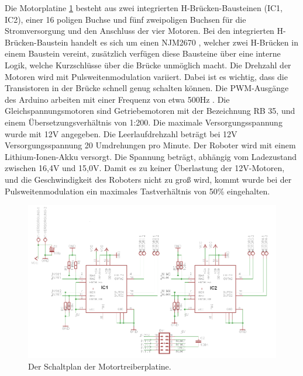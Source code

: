 \documentclass[a4paper,bibtotoc,oneside]{scrbook}
\begin{document}
Die Motorplatine \ref{hbridge2} besteht aus zwei integrierten H-Brücken-Bausteinen (IC1, IC2), einer 16 poligen Buchse und fünf zweipoligen Buchsen für die Stromversorgung und den Anschluss der vier Motoren. Bei den integrierten H-Brücken-Baustein handelt es sich um einen NJM2670 \cite{njm}, welcher zwei H-Brücken in einem Baustein vereint, zusätzlich verfügen diese Bausteine über eine interne Logik, welche Kurzschlüsse über die Brücke unmöglich macht.
Die Drehzahl der Motoren wird mit Pulsweitenmodulation variiert. Dabei ist es wichtig, dass die Transistoren in der Brücke schnell genug schalten können. Die PWM-Ausgänge des Arduino arbeiten mit einer Frequenz von etwa 500Hz \cite{pwm}.
Die Gleichspannungsmotoren sind Getriebemotoren mit der Bezeichnung RB 35, und einem Übersetzungsverhältnis von 1:200. Die maximale Versorgungsspannung wurde mit 12V angegeben. Die Leerlaufdrehzahl beträgt bei 12V Versorgungsspannung 20 Umdrehungen pro Minute.
Der Roboter wird mit einem Lithium-Ionen-Akku versorgt. Die Spannung beträgt, abhängig vom Ladezustand zwischen 16,4V und 15,0V. Damit es zu keiner Überlastung der 12V-Motoren, und die Geschwindigkeit des Roboters nicht zu groß wird, kommt wurde bei der Pulsweitenmodulation ein maximales Tastverhältnis von 50\% eingehalten.
 

\begin{figure}[htbp]
\centering
\includegraphics[width=150mm]{img/HBrucke.png}
\caption{Der Schaltplan der Motortreiberplatine.}\label{hbridge2}
\end{figure}
\end{document}
